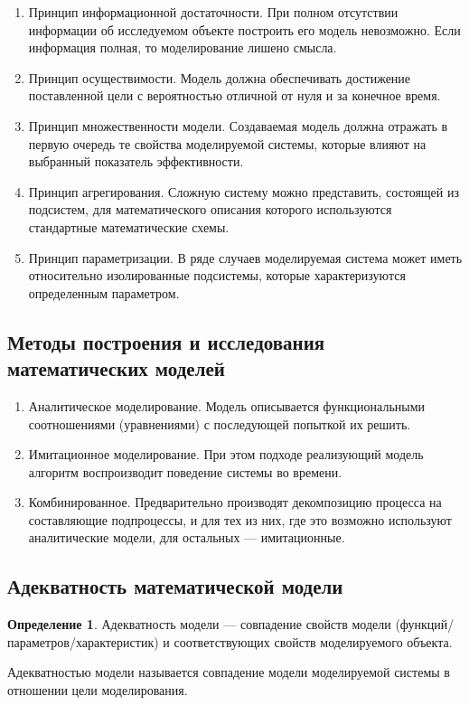 \documentclass[12pt]{report}
\theoremstyle{definition}
\newtheorem{definition}[theorem]{Определение}
\begin{document}
\begin{enumerate}
\item Принцип информационной достаточности.
  При полном отсутствии информации об исследуемом объекте
  построить его модель невозможно.
  Если информация полная, то моделирование лишено смысла.
\item Принцип осуществимости.
  Модель должна обеспечивать достижение поставленной цели с вероятностью
  отличной от нуля и за конечное время.
\item Принцип множественности модели.
  Создаваемая модель должна отражать в первую очередь те свойства
  моделируемой системы, которые влияют на выбранный показатель эффективности.
\item Принцип агрегирования.
  Сложную систему можно представить, состоящей из подсистем, для математического описания
  которого используются стандартные математические схемы.
\item Принцип параметризации. В ряде случаев моделируемая система может иметь
  относительно изолированные подсистемы, которые характеризуются определенным
  параметром. 
\end{enumerate}

\subsection{Методы построения и исследования математических моделей}

\begin{enumerate}
\item Аналитическое моделирование.
  Модель описывается функциональными соотношениями (уравнениями)
  с последующей попыткой их решить.
\item Имитационное моделирование.
  При этом подходе реализующий модель алгоритм воспроизводит поведение
  системы во времени.
\item Комбинированное.
  Предварительно производят декомпозицию процесса на составляющие подпроцессы,
  и для тех из них, где это возможно используют аналитические модели, для
  остальных --- имитационные.
\end{enumerate}

\subsection{Адекватность математической модели}
\begin{definition}
Адекватность модели --- совпадение свойств модели (функций/параметров/характеристик) и
соответствующих свойств моделируемого объекта.

Адекватностью модели называется совпадение модели моделируемой системы
в отношении цели моделирования.
\end{definition}
\end{document}
